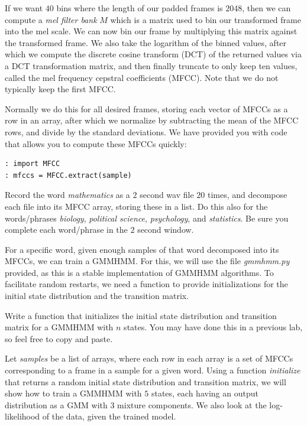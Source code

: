 If we want $40$ bins where the length of our padded frames is $2048$, then we can compute a \emph{mel filter bank} $M$ which is a matrix used to bin our transformed frame into the mel scale. We can now bin our frame by multiplying this matrix against the transformed frame. We also take the logarithm of the binned values, after which we compute the discrete cosine transform (DCT) of the returned values via a DCT transformation matrix, and then finally truncate to only keep ten values, called the mel frequency cepstral coefficients (MFCC). Note that we do not typically keep the first MFCC.

Normally we do this for all desired frames, storing each vector of MFCCs as a row in an array, after which we normalize by subtracting the mean of the MFCC rows, and divide by the standard deviations. We have provided you with code that allows you to compute these MFCCs quickly:

\begin{lstlisting}[style=python]
: import MFCC
: mfccs = MFCC.extract(sample)
\end{lstlisting}

\begin{problem}
Record the word \emph{mathematics} as a $2$ second wav file $20$ times, and decompose each file into its MFCC array, storing these in a list. Do this also for the words/phrases \emph{biology}, \emph{political science}, \emph{psychology}, and \emph{statistics}. Be sure you complete each word/phrase in the $2$ second window.
\end{problem}

For a specific word, given enough samples of that word decomposed into its MFCCs, we can train a GMMHMM. For this, we will use the file \emph{gmmhmm.py} provided, as this is a stable implementation of GMMHMM algorithms. To facilitate random restarts, we need a function to provide initializations for the initial state distribution and the transition matrix.

\begin{problem}
Write a function that initializes the initial state distribution and transition matrix for a GMMHMM with $n$ states. You may have done this in a previous lab, so feel free to copy and paste.
\end{problem}

Let \emph{samples} be a list of arrays, where each row in each array is a set of MFCCs corresponding to a frame in a sample for a given word. Using a function \emph{initialize} that returns a random initial state distribution and transition matrix, we will show how to train a GMMHMM with $5$ states, each having an output distribution as a GMM with $3$ mixture components. We also look at the log-likelihood of the data, given the trained model.

